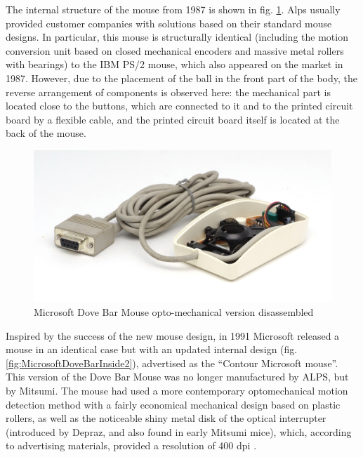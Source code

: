 \documentclass[11pt, a4paper]{article}
\begin{document}
The internal structure of the mouse from 1987 is shown in fig. \ref{fig:MicrosoftDoveBarInside}. Alps usually provided customer companies with solutions based on their standard mouse designs. In particular, this mouse is structurally identical (including the motion conversion unit based on closed mechanical encoders and massive metal rollers with bearings) to the IBM PS/2 mouse, which also appeared on the market in 1987. However, due to the placement of the ball in the front part of the body, the reverse arrangement of components is observed here: the mechanical part is located close to the buttons, which are connected to it and to the printed circuit board by a flexible cable, and the printed circuit board itself is located at the back of the mouse.

\begin{figure}[h]
    \centering
    \includegraphics[scale=0.6]{1987_microsoft_dove_bar_mouse/inside2_60.jpg}
    \caption{Microsoft Dove Bar Mouse opto-mechanical version disassembled}
    \label{fig:MicrosoftDoveBarInside}
\end{figure}

Inspired by the success of the new mouse design, in 1991 Microsoft released a mouse in an identical case but with an updated internal design (fig. \ref{fig:MicrosoftDoveBarInside2}), advertised as the ``Contour Microsoft mouse''. This version of the Dove Bar Mouse was no longer manufactured by ALPS, but by Mitsumi. The mouse had used a more contemporary optomechanical motion detection method with a fairly economical mechanical design based on plastic rollers, as well as the noticeable shiny metal disk of the optical interrupter (introduced by Depraz, and also found in early Mitsumi mice), which, according to advertising materials, provided a resolution of 400 dpi \cite{doveBarMouseOldMouses}.
\end{document}
